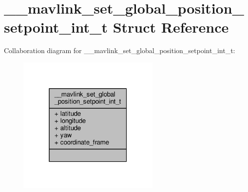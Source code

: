 \hypertarget{struct____mavlink__set__global__position__setpoint__int__t}{\section{\+\_\+\+\_\+mavlink\+\_\+set\+\_\+global\+\_\+position\+\_\+setpoint\+\_\+int\+\_\+t Struct Reference}
\label{struct____mavlink__set__global__position__setpoint__int__t}
}


Collaboration diagram for \+\_\+\+\_\+mavlink\+\_\+set\+\_\+global\+\_\+position\+\_\+setpoint\+\_\+int\+\_\+t\+:
\nopagebreak
\begin{figure}[H]
\begin{center}
\leavevmode
\includegraphics[width=199pt]{struct____mavlink__set__global__position__setpoint__int__t__coll__graph}
\end{center}
\end{figure}
